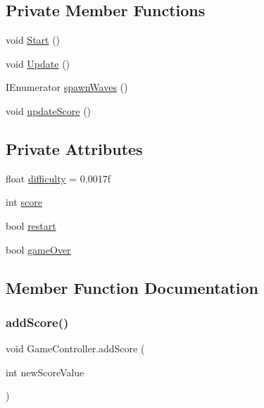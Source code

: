 \subsection*{Private Member Functions}
\begin{DoxyCompactItemize}
\item 
void \mbox{\hyperlink{class_game_controller_a97788a7aa0f09c8d748781683e5f045b}{Start}} ()
\item 
void \mbox{\hyperlink{class_game_controller_a5a89277529cadb49af7d55eba3bbf056}{Update}} ()
\item 
I\+Enumerator \mbox{\hyperlink{class_game_controller_afcbbff33b0d0fb1fed262dd67d52e9c3}{spawn\+Waves}} ()
\item 
void \mbox{\hyperlink{class_game_controller_a54d9efcafca6d05c967e375066ca1a27}{update\+Score}} ()
\end{DoxyCompactItemize}
\subsection*{Private Attributes}
\begin{DoxyCompactItemize}
\item 
float \mbox{\hyperlink{class_game_controller_aa8d3b5308427f0cbbbe8f34d3fd96d31}{difficulty}} = 0.\+0017f
\item 
int \mbox{\hyperlink{class_game_controller_a5262f16a935aa930f813ff9c0dc060f2}{score}}
\item 
bool \mbox{\hyperlink{class_game_controller_aeea923e78ddd573296687317e638a937}{restart}}
\item 
bool \mbox{\hyperlink{class_game_controller_aeae400ea0c604655ce5801818a5a44a1}{game\+Over}}
\end{DoxyCompactItemize}


\subsection{Member Function Documentation}
\mbox{\label{class_game_controller_a9cd49518487a342b5f635537d10b3589}} 
\subsubsection{\texorpdfstring{add\+Score()}{addScore()}}
{\footnotesize\ttfamily void Game\+Controller.\+add\+Score (\begin{DoxyParamCaption}\item[{int}]{new\+Score\+Value }\end{DoxyParamCaption})}

